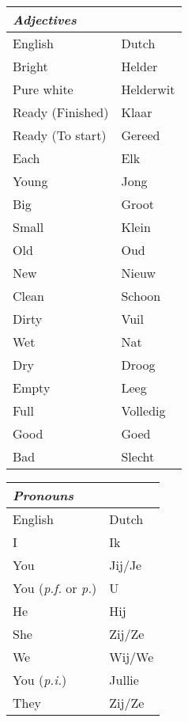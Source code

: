 \documentclass[letterpaper,11pt]{article}
\begin{document}
\begin{tabular}[t]{|l | l|}
    \hline
    \textit{Adjectives} &   \\
    \hline
    English          & Dutch      \\
    \hline
    Bright           & Helder \\
    Pure white       & Helderwit \\
    Ready (Finished) & Klaar \\
    Ready (To start) & Gereed \\
    Each             & Elk \\
    Young            & Jong \\
    Big              & Groot \\
    Small            & Klein \\
    Old              & Oud \\
    New              & Nieuw \\
    Clean            & Schoon \\
    Dirty            & Vuil \\
    Wet              & Nat \\
    Dry              & Droog \\
    Empty            & Leeg \\
    Full             & Volledig \\
    Good             & Goed \\
    Bad              & Slecht \\
    \hline
\end{tabular}
\begin{tabular}[t]{|l | l|}
    \hline
    \textit{Pronouns}                  &        \\
    \hline
    English                            & Dutch  \\
    \hline
    I                                  & Ik     \\
    You                                & Jij/Je \\
    You (\textit{p.f.} or \textit{p.}) & U      \\
    He                                 & Hij    \\
    She                                & Zij/Ze \\
    We                                 & Wij/We \\
    You (\textit{p.i.})                & Jullie \\
    They                               & Zij/Ze \\
    \hline
\end{tabular}
\end{document}
